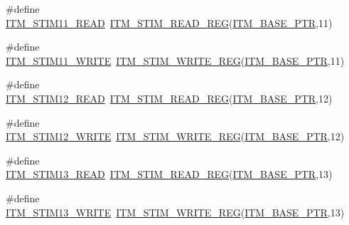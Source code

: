 \begin{DoxyCompactItemize}
\item 
\#define \hyperlink{group___i_t_m___register___accessor___macros_ga0303347d6234c6044d64450073e3111d}{I\+T\+M\+\_\+\+S\+T\+I\+M11\+\_\+\+R\+E\+AD}~\hyperlink{group___i_t_m___register___accessor___macros_ga5009882336aadcd4f37b45cf3395c450}{I\+T\+M\+\_\+\+S\+T\+I\+M\+\_\+\+R\+E\+A\+D\+\_\+\+R\+EG}(\hyperlink{group___i_t_m___peripheral_gafaddee8fe8b6a898d4e5edc43ee0d703}{I\+T\+M\+\_\+\+B\+A\+S\+E\+\_\+\+P\+TR},11)
\item 
\#define \hyperlink{group___i_t_m___register___accessor___macros_ga2b6f1a25e7ac17786baf3b401c94a1d9}{I\+T\+M\+\_\+\+S\+T\+I\+M11\+\_\+\+W\+R\+I\+TE}~\hyperlink{group___i_t_m___register___accessor___macros_ga049ca92a4e78e77c19af81e51aa73f1c}{I\+T\+M\+\_\+\+S\+T\+I\+M\+\_\+\+W\+R\+I\+T\+E\+\_\+\+R\+EG}(\hyperlink{group___i_t_m___peripheral_gafaddee8fe8b6a898d4e5edc43ee0d703}{I\+T\+M\+\_\+\+B\+A\+S\+E\+\_\+\+P\+TR},11)
\item 
\#define \hyperlink{group___i_t_m___register___accessor___macros_gabb2b8e4fa01909ba0dda5d7d62bb2b0c}{I\+T\+M\+\_\+\+S\+T\+I\+M12\+\_\+\+R\+E\+AD}~\hyperlink{group___i_t_m___register___accessor___macros_ga5009882336aadcd4f37b45cf3395c450}{I\+T\+M\+\_\+\+S\+T\+I\+M\+\_\+\+R\+E\+A\+D\+\_\+\+R\+EG}(\hyperlink{group___i_t_m___peripheral_gafaddee8fe8b6a898d4e5edc43ee0d703}{I\+T\+M\+\_\+\+B\+A\+S\+E\+\_\+\+P\+TR},12)
\item 
\#define \hyperlink{group___i_t_m___register___accessor___macros_ga61fb646c29b6f56928ca4e570b1e4167}{I\+T\+M\+\_\+\+S\+T\+I\+M12\+\_\+\+W\+R\+I\+TE}~\hyperlink{group___i_t_m___register___accessor___macros_ga049ca92a4e78e77c19af81e51aa73f1c}{I\+T\+M\+\_\+\+S\+T\+I\+M\+\_\+\+W\+R\+I\+T\+E\+\_\+\+R\+EG}(\hyperlink{group___i_t_m___peripheral_gafaddee8fe8b6a898d4e5edc43ee0d703}{I\+T\+M\+\_\+\+B\+A\+S\+E\+\_\+\+P\+TR},12)
\item 
\#define \hyperlink{group___i_t_m___register___accessor___macros_ga926c47eb7733a253885c7246858defa7}{I\+T\+M\+\_\+\+S\+T\+I\+M13\+\_\+\+R\+E\+AD}~\hyperlink{group___i_t_m___register___accessor___macros_ga5009882336aadcd4f37b45cf3395c450}{I\+T\+M\+\_\+\+S\+T\+I\+M\+\_\+\+R\+E\+A\+D\+\_\+\+R\+EG}(\hyperlink{group___i_t_m___peripheral_gafaddee8fe8b6a898d4e5edc43ee0d703}{I\+T\+M\+\_\+\+B\+A\+S\+E\+\_\+\+P\+TR},13)
\item 
\#define \hyperlink{group___i_t_m___register___accessor___macros_gab8eddf17288ccf56195272767250b472}{I\+T\+M\+\_\+\+S\+T\+I\+M13\+\_\+\+W\+R\+I\+TE}~\hyperlink{group___i_t_m___register___accessor___macros_ga049ca92a4e78e77c19af81e51aa73f1c}{I\+T\+M\+\_\+\+S\+T\+I\+M\+\_\+\+W\+R\+I\+T\+E\+\_\+\+R\+EG}(\hyperlink{group___i_t_m___peripheral_gafaddee8fe8b6a898d4e5edc43ee0d703}{I\+T\+M\+\_\+\+B\+A\+S\+E\+\_\+\+P\+TR},13)

\end{DoxyCompactItemize}
